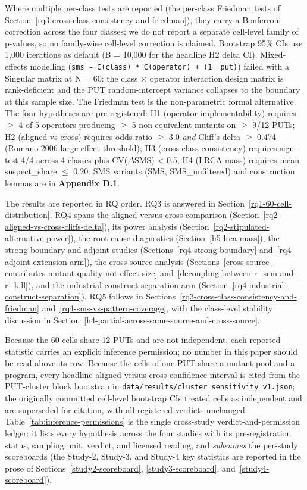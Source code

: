 \documentclass[manuscript,screen,review]{acmart}
\begin{document}
Where multiple per-class tests are reported (the per-class Friedman tests
of Section~\ref{rq3-cross-class-consistency-and-friedman}), they carry a Bonferroni correction across the four classes; we
do not report a separate cell-level family of p-values, so no family-wise
cell-level correction is claimed. Bootstrap 95\% CIs use 1,000 iterations
as default (B = 10,000 for the headline H2 delta CI). Mixed-effects
modelling
(\texttt{sms\ \textasciitilde{}\ C(class)\ *\ C(operator)\ +\ (1\ \textbar{}\ put)})
failed with a Singular matrix at N = 60: the class $\times$ operator
interaction design matrix is rank-deficient and the PUT random-intercept
variance collapses to the boundary at this sample size. The Friedman test
is the non-parametric formal alternative. The four hypotheses are
pre-registered: H1 (operator implementability) requires $\geq$ 4 of 5
operators producing $\geq$ 5 non-equivalent mutants on $\geq$ 9/12 PUTs; H2
(aligned-vs-cross) requires odds ratio $\geq$ 3.0 \emph{and} Cliff's delta $\geq$
0.474 (Romano 2006 large-effect threshold); H3 (cross-class consistency)
requires sign-test 4/4 across 4 classes plus CV($\Delta$SMS) \textless{} 0.5;
H4 (LRCA mass) requires mean suspect\_share $\leq$ 0.20. SMS variants
(SMS, SMS\_unfiltered) and construction lemmas are in
\textbf{Appendix D.1}.

The results are reported in RQ order. RQ3 is answered in
Section~\ref{rq1-60-cell-distribution}. RQ4 spans the aligned-versus-cross
comparison (Section~\ref{rq2-aligned-vs-cross-cliffs-delta}), its power
analysis (Section~\ref{rq2-stipulated-alternative-power}), the root-cause
diagnostics (Section~\ref{h5-lrca-mass}), the strong-boundary and adjoint
studies (Sections~\ref{rq4-strong-boundary} and~\ref{rq4-adjoint-extension-arm}),
the cross-source analysis
(Sections~\ref{cross-source-contributes-mutant-quality-not-effect-size}
and~\ref{decoupling-between-r_sem-and-r_kill}), and the industrial
construct-separation arm
(Section~\ref{rq4-industrial-construct-separation}). RQ5 follows in
Sections~\ref{rq3-cross-class-consistency-and-friedman}
and~\ref{rq4-sms-vs-pattern-coverage}, with the class-level stability
discussion in Section~\ref{h4-partial-across-same-source-and-cross-source}.

Because the 60 cells share 12 PUTs and are not independent, each reported
statistic carries an explicit inference permission; no number in this paper
should be read above its row. Because the cells of one PUT share a mutant pool
and a program, every headline aligned-versus-cross confidence interval is cited
from the PUT-cluster block bootstrap in
\texttt{data/results/cluster\_sensitivity\_v1.json}; the originally committed
cell-level bootstrap CIs treated cells as independent and are superseded for
citation, with all registered verdicts unchanged. Table~\ref{tab:inference-permissions} is the
single cross-study verdict-and-permission ledger: it lists every hypothesis
across the four studies with its pre-registration status, sampling unit,
verdict, and licensed reading, and \emph{subsumes} the per-study scoreboards
(the Study-2, Study-3, and Study-4 key statistics are reported in the prose of
Sections~\ref{study2-scoreboard}, \ref{study3-scoreboard},
and~\ref{study4-scoreboard}).
\end{document}
